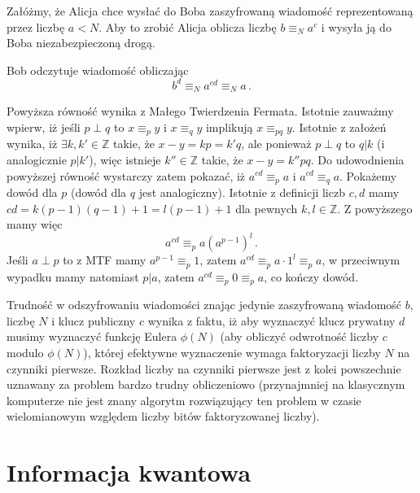 \documentclass{myclass}
\begin{document}
Załóżmy, że Alicja chce wysłać do Boba zaszyfrowaną wiadomość reprezentowaną przez liczbę \(a < N\).
Aby to zrobić Alicja oblicza liczbę \(b \equiv_N a^c\) i wysyła ją do Boba niezabezpieczoną drogą.

Bob odczytuje wiadomość obliczając
\begin{equation*}
    b^d \equiv_N a^{cd} \equiv_N a\,.
\end{equation*}

Powyższa równość wynika z Małego Twierdzenia Fermata. Istotnie zauważmy wpierw, iż jeśli \(p \perp
q\) to \(x \equiv_p y\) i \(x \equiv_q y\) implikują \(x \equiv_{pq} y\). Istotnie z założeń wynika,
iż \(\exists k,k' \in \mathbb{Z}\) takie, że \(x - y = kp = k'q\), ale ponieważ \(p \perp q\) to \(q
| k\) (i analogicznie \(p | k'\)), więc istnieje \(k'' \in \mathbb{Z}\) takie, że \(x - y = k''
pq\). Do udowodnienia powyższej równość wystarczy zatem pokazać, iż \(a^{cd} \equiv_p a\) i \(a^{cd}
\equiv_q  a\). Pokażemy dowód dla \(p\) (dowód dla \(q\) jest analogiczny). Istotnie z definicji
liczb \(c,d\) mamy \(cd = k(p-1)(q-1) + 1 = l(p-1) + 1\) dla pewnych \(k,l\in\mathbb{Z}\). Z
powyższego mamy więc
\begin{equation*}
    a^{cd} \equiv_p a(a^{p-1})^l\,.
\end{equation*}
Jeśli \(a \perp p\) to z MTF mamy \(a^{p-1} \equiv_p 1\), zatem \(a^{cd} \equiv_p a\cdot1^l \equiv_p
a\), w przeciwnym wypadku mamy natomiast \(p | a\), zatem \(a^{cd} \equiv_p 0 \equiv_p a\), co
kończy dowód.

Trudność w odszyfrowaniu wiadomości znając jedynie zaszyfrowaną wiadomość \(b\), liczbę \(N\) i
klucz publiczny \(c\) wynika z faktu, iż aby wyznaczyć klucz prywatny \(d\) musimy wyznaczyć funkcję
Eulera \(\phi(N)\) (aby obliczyć odwrotność liczby \(c\) modulo \(\phi(N)\)), której efektywne
wyznaczenie wymaga faktoryzacji liczby \(N\) na czynniki pierwsze. Rozkład liczby na czynniki
pierwsze jest z kolei powszechnie uznawany za problem bardzo trudny obliczeniowo (przynajmniej na
klasycznym komputerze nie jest znany algorytm rozwiązujący ten problem w czasie wielomianowym
względem liczby bitów faktoryzowanej liczby).


\section{Informacja kwantowa}
\end{document}
